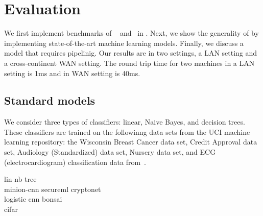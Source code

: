 \section{Evaluation}
\label{sec:eval}

We first implement benchmarks of ~\cite{shafindss} and~\cite{minionn} in \tool.
Next, we show the generality of \tool by implementing state-of-the-art machine learning models.
Finally, we discuss a model that requires pipelinig.
Our results are in two settings, a LAN setting and a cross-continent WAN setting.
The round trip time for two machines in a LAN setting is 1ms and in WAN setting is 40ms.

\subsection{Standard models}
\label{sec:shallow}
We consider three types of classifiers: linear, Naive Bayes, and decision trees. 
These classifiers are trained on the followinng data sets from the UCI  machine learning repository:
 the Wisconsin Breast Cancer data set, 
Credit Approval data set, Audiology (Standardized) data set, Nursery data set, and
ECG (electrocardiogram) classification data from~\cite{barni}.



lin
nb
tree\\
minion-cnn
secureml
cryptonet\\
logistic
cnn
bonsai\\
cifar